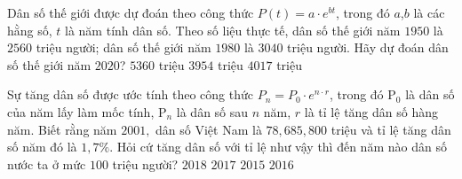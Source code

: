 \begin{ex} %
	Dân số thế giới được dự đoán theo công thức $P(t)=a \cdot e^{bt}$, trong đó $ a$,$ b$ là các hằng số, $ t$ là năm tính dân số. Theo số liệu thực tế, dân số thế giới năm $1950$ là $2560$ triệu người; dân số thế giới năm $1980$ là $3040$ triệu người. Hãy dự đoán dân số thế giới năm $2020$?
	 { $5360$ triệu} { $3954$ triệu} { $4017$ triệu}
\end{ex}
\begin{ex} %
	Sự tăng dân số được ước tính theo công thức ${P}_n={{P}_0} \cdot {{e}^{n\cdot r}}$, trong đó ${\mathrm{P}_0}$ là dân số của năm lấy làm mốc tính, ${\mathrm{P}_n}$ là dân số sau $ n$ năm, $r$ là tỉ lệ tăng dân số hàng năm. Biết rằng năm $2001,$ dân số Việt Nam là $78{,}685{,}800$ triệu và tỉ lệ tăng dân số năm đó là $1{,}7\%$. Hỏi cứ tăng dân số với tỉ lệ như vậy thì đến năm nào dân số nước ta ở mức $100$ triệu người?
	\choice 
	{$2018$}
	{$2017$}
	{$2015$} 
	{\True $2016$}
\end{ex}
